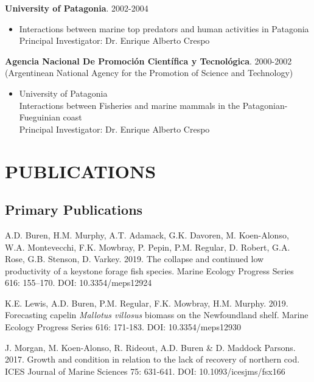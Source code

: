 \documentclass{res}
\begin{document}
\begin{resume}
\textbf{University of Patagonia}. 2002-2004
\begin{itemize} %
	\item[] Interactions between marine top predators and human activities in Patagonia\\
Principal Investigator: Dr. Enrique Alberto Crespo
\end{itemize}



\textbf{Agencia Nacional De Promoci\'{o}n Cient\'{i}fica y Tecnol\'{o}gica}. 2000-2002\\
(Argentinean National Agency for the Promotion of Science and Technology)
\begin{itemize} %
	\item[] University of Patagonia\\
Interactions between Fisheries and marine mammals in the Patagonian-Fueguinian coast\\
Principal Investigator: Dr. Enrique Alberto Crespo
\end{itemize}


\section{PUBLICATIONS} 
\subsection{Primary Publications}
\begin{hangparas}{.4in}{1}

A.D. Buren, H.M. Murphy, A.T. Adamack, G.K. Davoren, M. Koen-Alonso, W.A. Montevecchi, F.K. Mowbray, P. Pepin, P.M. Regular, D. Robert, G.A. Rose, G.B. Stenson, D. Varkey. 2019. The collapse and continued low productivity of a keystone forage fish species. Marine Ecology Progress Series 616: 155–170. DOI: 10.3354/meps12924

K.E. Lewis, A.D. Buren, P.M. Regular, F.K. Mowbray, H.M. Murphy. 2019. Forecasting capelin \textit{Mallotus villosus} biomass on the Newfoundland shelf. Marine Ecology Progress Series 616: 171-183. DOI: 10.3354/meps12930

J. Morgan, M. Koen-Alonso, R. Rideout, A.D. Buren \& D. Maddock Parsons. 2017. Growth and condition in relation to the lack of recovery of northern cod. ICES Journal of Marine Sciences 75: 631-641. DOI: 10.1093/icesjms/fsx166


\end{hangparas}
\end{resume}
\end{document}
